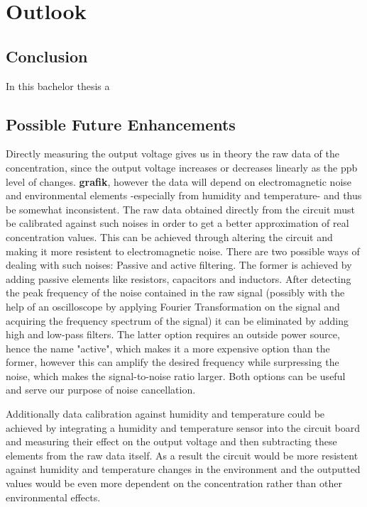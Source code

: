 \chapter{Outlook}
\label{sec:outlook}
\section{Conclusion}

In this bachelor thesis a 

\section{Possible Future Enhancements}
Directly measuring the output voltage gives us in theory the raw data of the  concentration, since the output voltage increases or decreases linearly as the ppb level of  changes. \textbf{grafik}, however the data will depend on electromagnetic noise and environmental elements -especially from humidity and temperature- and thus be somewhat inconsistent. The raw data obtained directly from the circuit must be calibrated against such noises in order to get a better approximation of real concentration values. This can be achieved through altering the circuit and making it more resistent to electromagnetic noise. There are two possible ways of dealing with such noises: Passive and active filtering. The former is achieved by adding passive elements like resistors, capacitors and inductors. After detecting the peak frequency of the noise contained in the raw signal (possibly with the help of an oscilloscope by applying Fourier Transformation on the signal and acquiring the frequency spectrum of the signal) it can be eliminated by adding high and low-pass filters. The latter option requires an outside power source, hence the name "active", which makes it a more expensive option than the former, however this can amplify the desired frequency while surpressing the noise, which makes the signal-to-noise ratio larger. Both options can be useful and serve our purpose of noise cancellation.\par 
Additionally data calibration against humidity and temperature could be achieved by integrating a humidity and temperature sensor into the circuit board and measuring their effect on the output voltage and then subtracting these elements from the raw data itself. As a result the circuit would be more resistent against humidity and temperature changes in the environment and the outputted values would be even more dependent on the  concentration rather than other environmental effects. \par



